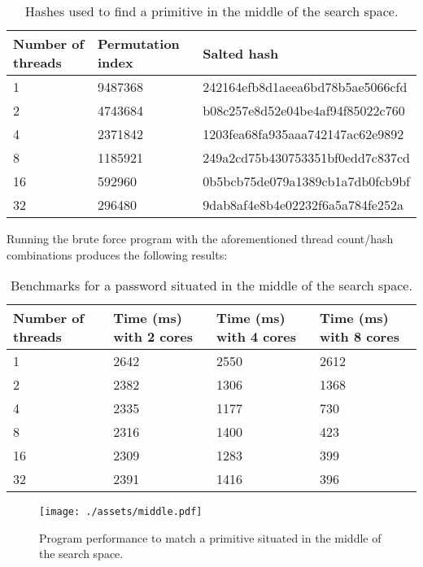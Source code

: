 \documentclass{article}
\begin{document}
\begin{table}[!ht]
    \centering
    \begin{tabular}{|l|l|l|}
    \hline
        Number of threads & Permutation index & Salted hash \\ \hline
        1 & 9487368 & 242164efb8d1aeea6bd78b5ae5066cfd \\ \hline
        2 & 4743684 & b08c257e8d52e04be4af94f85022c760 \\ \hline
        4 & 2371842 & 1203fea68fa935aaa742147ac62e9892 \\ \hline
        8 & 1185921 & 249a2cd75b430753351bf0edd7c837cd \\ \hline
        16 & 592960 & 0b5bcb75de079a1389cb1a7db0fcb9bf \\ \hline
        32 & 296480 & 9dab8af4e8b4e02232f6a5a784fe252a \\ \hline
    \end{tabular}
    \caption{Hashes used to find a primitive in the middle of the search space.}
\end{table}

Running the brute force program with the aforementioned thread count/hash combinations produces the following results:

\begin{table}[!ht]
    \centering
    \begin{tabular}{|l|l|l|l|}
    \hline
        Number of threads & Time (ms) with 2 cores & Time (ms) with 4 cores & Time (ms) with 8 cores \\ \hline
        1 & 2642 & 2550 & 2612 \\ \hline
        2 & 2382 & 1306 & 1368 \\ \hline
        4 & 2335 & 1177 & 730 \\ \hline
        8 & 2316 & 1400 & 423 \\ \hline
        16 & 2309 & 1283 & 399 \\ \hline
        32 & 2391 & 1416 & 396 \\ \hline
    \end{tabular}
    \caption{Benchmarks for a password situated in the middle of the search space.}
\end{table}

\begin{figure}[!htb]
    \centering
    \texttt{[image: ./assets/middle.pdf]}
    \caption{Program performance to match a primitive situated in the middle of the search space.}
\end{figure}
\end{document}
